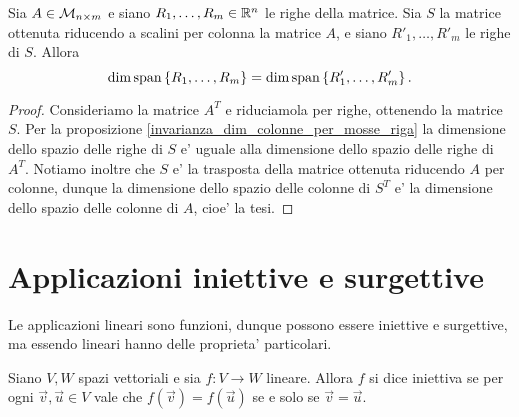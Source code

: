 \begin{corollary}\label{invarianza_dim_righe_per_mosse_colonna}
    Sia $A \in \mathcal{M}_{n\times m}$ e siano $R_1, \dots, R_m \in \mathbb{R}^n$ le righe della matrice. Sia $S$ la matrice ottenuta riducendo a scalini per colonna la matrice $A$, e siano $R'_1, \dots, R'_m$ le righe di $S$. Allora \begin{equation}
        \dim \operatorname{span}\left\{R_1, \dots, R_m\right\} = \dim \operatorname{span}\left\{R'_1, \dots, R'_m\right\}.
    \end{equation}
\end{corollary}
\begin{proof}
    Consideriamo la matrice $A^T$ e riduciamola per righe, ottenendo la matrice $S$. Per la proposizione \ref{invarianza_dim_colonne_per_mosse_riga} la dimensione dello spazio delle righe di $S$ e' uguale alla dimensione dello spazio delle righe di $A^T$. Notiamo inoltre che $S$ e' la trasposta della matrice ottenuta riducendo $A$ per colonne, dunque la dimensione dello spazio delle colonne di $S^T$ e' la dimensione dello spazio delle colonne di $A$, cioe' la tesi.
\end{proof}

\section{Applicazioni iniettive e surgettive}

Le applicazioni lineari sono funzioni, dunque possono essere iniettive e surgettive, ma essendo lineari hanno delle proprieta' particolari.

\begin{definition}
    Siano $V, W$ spazi vettoriali e sia $f : V \to W$ lineare. Allora $f$ si dice iniettiva se per ogni $\vec{v}, \vec{u} \in V$ vale che $f(\vec{v}) = f(\vec{u})$ se e solo se $\vec{v} = \vec{u}$.
\end{definition}


